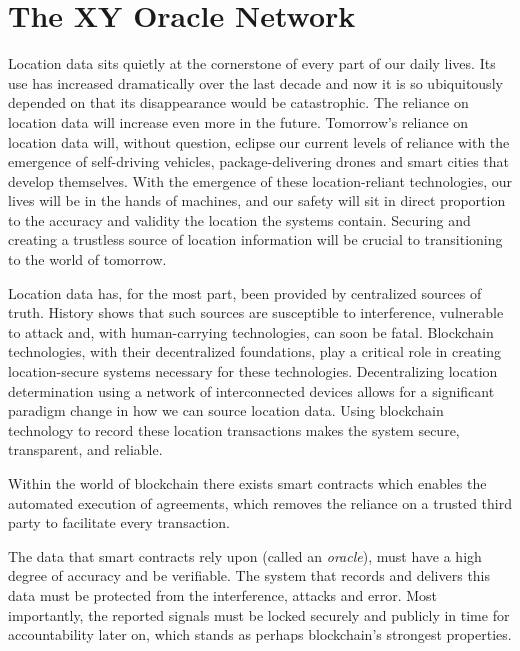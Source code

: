 \documentclass{article}
\begin{document}
\section{The XY Oracle Network}

Location data sits quietly at the cornerstone of every part of our daily lives. Its use has increased dramatically over the last decade and now it is so ubiquitously depended on that its disappearance would be catastrophic. The reliance on location data will increase even more in the future. Tomorrow's reliance on location data will, without question, eclipse our current levels of reliance with the emergence of self-driving vehicles, package-delivering drones and smart cities that develop themselves. With the emergence of these location-reliant technologies, our lives will be in the hands of machines, and our safety will sit in direct proportion to the accuracy and validity the location the systems contain. Securing and creating a trustless source of location information will be crucial to transitioning to the world of tomorrow.

Location data has, for the most part, been provided by centralized sources of truth. History shows that such sources are susceptible to interference, vulnerable to attack and, with human-carrying technologies, can soon be fatal. Blockchain technologies, with their decentralized foundations, play a critical role in creating location-secure systems necessary for these technologies. Decentralizing location determination using a network of interconnected devices allows for a significant paradigm change in how we can source location data. Using blockchain technology to record these location transactions makes the system secure, transparent, and reliable.

Within the world of blockchain there exists smart contracts which enables the automated execution of agreements, which removes the reliance on a trusted third party to facilitate every transaction.

The data that smart contracts rely upon (called an \textit{oracle}), must have a high degree of accuracy and be verifiable. The system that records and delivers this data must be protected from the interference, attacks and error. Most importantly, the reported signals must be locked securely and publicly in time for accountability later on, which stands as perhaps blockchain's strongest properties.
\end{document}
